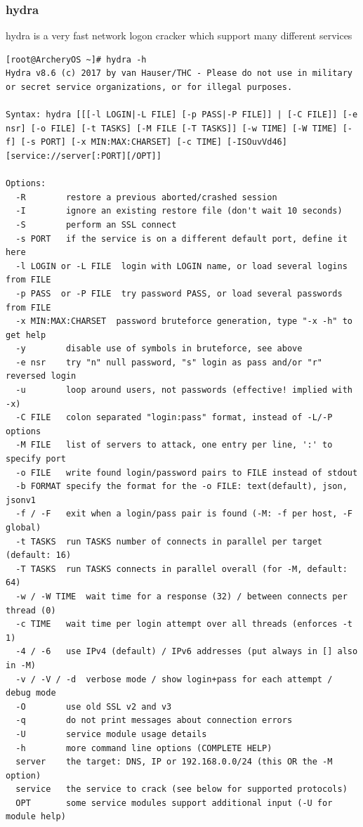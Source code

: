\documentclass{article}
\begin{document}
\subsubsection{hydra}
hydra is a very fast network logon cracker which support many different services
\begin{lstlisting}
[root@ArcheryOS ~]# hydra -h
Hydra v8.6 (c) 2017 by van Hauser/THC - Please do not use in military or secret service organizations, or for illegal purposes.

Syntax: hydra [[[-l LOGIN|-L FILE] [-p PASS|-P FILE]] | [-C FILE]] [-e nsr] [-o FILE] [-t TASKS] [-M FILE [-T TASKS]] [-w TIME] [-W TIME] [-f] [-s PORT] [-x MIN:MAX:CHARSET] [-c TIME] [-ISOuvVd46] [service://server[:PORT][/OPT]]

Options:
  -R        restore a previous aborted/crashed session
  -I        ignore an existing restore file (don't wait 10 seconds)
  -S        perform an SSL connect
  -s PORT   if the service is on a different default port, define it here
  -l LOGIN or -L FILE  login with LOGIN name, or load several logins from FILE
  -p PASS  or -P FILE  try password PASS, or load several passwords from FILE
  -x MIN:MAX:CHARSET  password bruteforce generation, type "-x -h" to get help
  -y        disable use of symbols in bruteforce, see above
  -e nsr    try "n" null password, "s" login as pass and/or "r" reversed login
  -u        loop around users, not passwords (effective! implied with -x)
  -C FILE   colon separated "login:pass" format, instead of -L/-P options
  -M FILE   list of servers to attack, one entry per line, ':' to specify port
  -o FILE   write found login/password pairs to FILE instead of stdout
  -b FORMAT specify the format for the -o FILE: text(default), json, jsonv1
  -f / -F   exit when a login/pass pair is found (-M: -f per host, -F global)
  -t TASKS  run TASKS number of connects in parallel per target (default: 16)
  -T TASKS  run TASKS connects in parallel overall (for -M, default: 64)
  -w / -W TIME  wait time for a response (32) / between connects per thread (0)
  -c TIME   wait time per login attempt over all threads (enforces -t 1)
  -4 / -6   use IPv4 (default) / IPv6 addresses (put always in [] also in -M)
  -v / -V / -d  verbose mode / show login+pass for each attempt / debug mode 
  -O        use old SSL v2 and v3
  -q        do not print messages about connection errors
  -U        service module usage details
  -h        more command line options (COMPLETE HELP)
  server    the target: DNS, IP or 192.168.0.0/24 (this OR the -M option)
  service   the service to crack (see below for supported protocols)
  OPT       some service modules support additional input (-U for module help)


\end{lstlisting}
\end{document}
